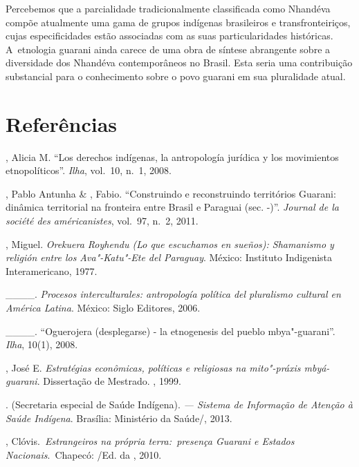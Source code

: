 

Percebemos que a parcialidade tradicionalmente classificada como
Nhandéva compõe atualmente uma gama de grupos indígenas brasileiros e
transfronteiriços, cujas especificidades estão associadas com as suas
particularidades históricas. A~etnologia guarani ainda carece de uma
obra de síntese abrangente sobre a diversidade dos Nhandéva
contemporâneos no Brasil. Esta seria uma
contribuição substancial para o conhecimento sobre o povo guarani em
sua pluralidade atual. 

\section{Referências}

\begin{Parskip}
, Alicia M. ``Los derechos indígenas, la antropología jurídica y
los movimientos etnopolíticos''. \emph{Ilha}, vol.~10, n.~1, 2008.

, Pablo Antunha \& , Fabio. ``Construindo e reconstruindo
territórios Guarani: dinâmica territorial na fronteira entre Brasil e
Paraguai (sec. -)''. \emph{Journal de la société des américanistes}, vol.~97, n.~2,
2011. 

, Miguel. \emph{Orekuera Royhendu (Lo que escuchamos en
sueños): Shamanismo y religión entre los Ava"-Katu"-Ete del Paraguay}.
México: Instituto Indigenista Interamericano, 1977.

\_\_\_\_. \emph{Procesos interculturales: antropología política
del pluralismo cultural en América Latina}. México: Siglo  Editores,
2006.

\_\_\_\_. ``Oguerojera (desplegarse) - la etnogenesis del
pueblo mbya"-guarani''. \emph{Ilha}, 10(1), 2008.

 , José E. \emph{Estratégias econômicas, políticas e religiosas
na mito"-práxis mbyá-guarani}. Dissertação de Mestrado. , 1999.

.  (Secretaria especial de Saúde Indígena). \emph{ — Sistema
de Informação de Atenção à Saúde Indígena}. Brasília: Ministério da
Saúde/, 2013.

, Clóvis.\emph{~Estrangeiros na própria terra:~presença
Guarani e Estados Nacionais}.~Chapecó: /Ed. da , 2010. 


\end{Parskip}
